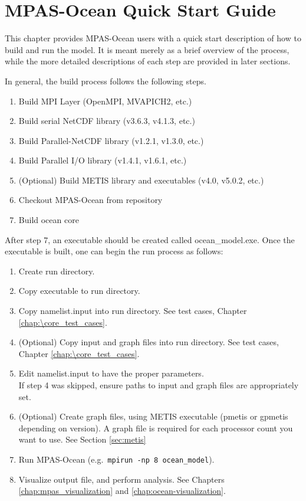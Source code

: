 \chapter{MPAS-Ocean Quick Start Guide}
\label{chap:quick_start}

This chapter provides MPAS-Ocean users with a quick start description of how to
build and run the model. It is meant merely as a brief overview of the process,
while the more detailed descriptions of each step are provided in later
sections.

In general, the build process follows the following steps.

\begin{enumerate}
	\item Build MPI Layer (OpenMPI, MVAPICH2, etc.)
	\item Build serial NetCDF library (v3.6.3, v4.1.3, etc.)
	\item Build Parallel-NetCDF library (v1.2.1, v1.3.0, etc.)
	\item Build Parallel I/O library (v1.4.1, v1.6.1, etc.)
	\item (Optional) Build METIS library and executables (v4.0, v5.0.2, etc.)
	\item Checkout MPAS-Ocean from repository
	\item Build ocean core
\end{enumerate}

After step 7, an executable should be created called ocean\_model.exe. Once the executable is built, one can begin the run process as follows:

\begin{enumerate}
	\item Create run directory.
	\item Copy executable to run directory.
	\item Copy namelist.input into run directory.  See test cases, Chapter \ref{chap:\core_test_cases}.
	\item (Optional) Copy input and graph files into run directory.  See test cases, Chapter \ref{chap:\core_test_cases}.
	\item Edit namelist.input to have the proper parameters. \\
		  If step 4 was skipped, ensure paths to input and graph files are appropriately set.
	\item (Optional) Create graph files, using METIS executable (pmetis or gpmetis depending on version).  A graph file is required for each processor count you want to use.  See Section \ref{sec:metis}
	\item Run MPAS-Ocean (e.g.\ {\tt mpirun -np 8 ocean\_model}).
	\item Visualize output file, and perform analysis.  See Chapters \ref{chap:mpas_visualization} and \ref{chap:ocean-visualization}.
\end{enumerate}
